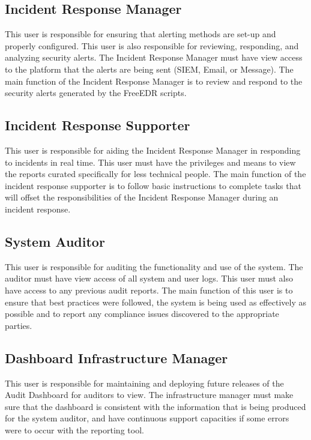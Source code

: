 \documentclass{scrreprt}
\begin{document}
\subsection{Incident Response Manager}

This user is responsible for ensuring that alerting methods are set-up and properly configured. This user is also responsible for reviewing, responding, and analyzing security alerts. The Incident Response Manager must have view access to the platform that the alerts are being sent (SIEM, Email, or Message). The main function of the Incident Response Manager is to review and respond to the security alerts generated by the FreeEDR scripts.


\subsection{Incident Response Supporter}

This user is responsible for aiding the Incident Response Manager in responding to incidents in real time. This user must have the privileges and means to view the reports curated specifically for less technical people. The main function of the incident response supporter is to follow basic instructions to complete tasks that will offset the responsibilities of the Incident Response Manager during an incident response. 

\subsection{System Auditor}

This user is responsible for auditing the functionality and use of the system. The auditor must have view access of all system and user logs. This user must also have access to any previous audit reports. The main function of this user is to ensure that best practices were followed, the system is being used as effectively as possible and to report any compliance issues discovered to the appropriate parties.

\subsection{Dashboard Infrastructure Manager}

This user is responsible for maintaining and deploying future releases of the Audit Dashboard for auditors to view. The infrastructure manager must make sure that the dashboard is consistent with the information that is being produced for the system auditor, and have continuous support capacities if some errors were to occur with the reporting tool.
\end{document}
